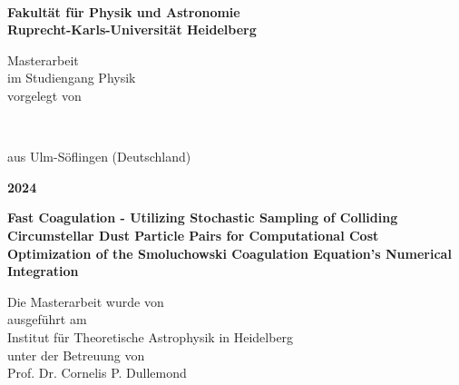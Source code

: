 
\begin{titlepage}
    \ 
\end{titlepage}

\begin{titlepage}
    \begin{center}
        \begin{Large}
            \textbf{
              Fakultät für Physik und Astronomie \\
              Ruprecht-Karls-Universität Heidelberg
            }
        \end{Large}

        \vfill
        
        Masterarbeit \\
        im Studiengang Physik \\
        vorgelegt von \\
        \vspace{0.5cm}

        \begin{Large}
            \textbf{\theauthor} \\
        \end{Large}
        \vspace{0.5cm}

        aus Ulm-Söflingen (Deutschland) \\
        \vspace{0.5cm}

        \begin{Large}
            \textbf{2024}
        \end{Large}
    \end{center}
\end{titlepage}

\newpage

\begin{titlepage}
    \begin{center}
        \begin{Large}
            \textbf{
                Fast Coagulation - Utilizing Stochastic Sampling of Colliding Circumstellar Dust 
                Particle Pairs for Computational Cost Optimization of the Smoluchowski Coagulation 
                Equation's Numerical Integration
            }
        \end{Large}
        
        \vfill
        
        Die Masterarbeit wurde von \theauthor \\
        ausgeführt am \\
        Institut für Theoretische Astrophysik in Heidelberg \\
        unter der Betreuung von \\
        Prof. Dr. Cornelis P. Dullemond
    \end{center}
\end{titlepage}

